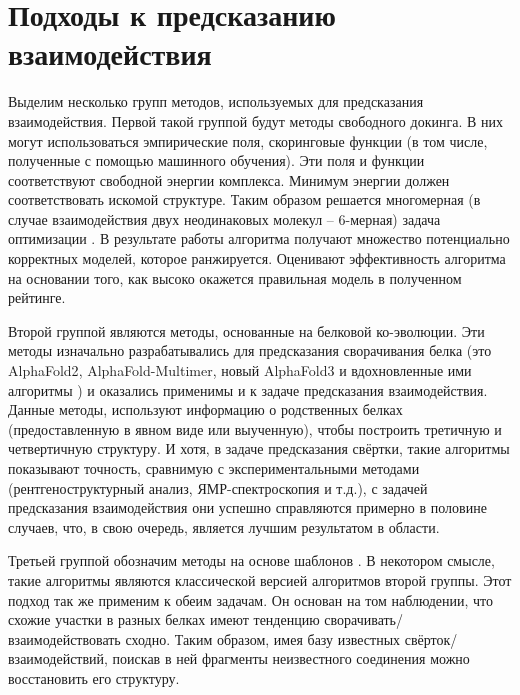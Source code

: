 \section{Подходы к предсказанию взаимодействия}
Выделим несколько групп методов, используемых для предсказания взаимодействия. Первой такой группой будут методы свободного докинга. В них могут использоваться эмпирические поля, скоринговые функции (в том числе, полученные с помощью машинного обучения). Эти поля и функции соответствуют свободной энергии комплекса. Минимум энергии должен соответствовать искомой структуре. Таким образом решается многомерная (в случае взаимодействия двух неодинаковых молекул – 6-мерная) задача оптимизации \cite{vreven}. В результате работы алгоритма получают множество потенциально корректных моделей, которое ранжируется. Оценивают эффективность алгоритма на основании того, как высоко окажется правильная модель в полученном рейтинге.

Второй группой являются методы, основанные на белковой ко-эволюции. Эти методы изначально разрабатывались для предсказания сворачивания белка (это AlphaFold2\cite{AF2}, AlphaFold-Multimer\cite{AFM}, новый AlphaFold3\cite{AF3} и вдохновленные ими алгоритмы \cite{AF_followers}) и оказались применимы и к задаче предсказания взаимодействия. Данные методы, используют информацию о родственных белках (предоставленную в явном виде или выученную), чтобы построить третичную и четвертичную структуру. И хотя, в задаче предсказания свёртки, такие алгоритмы показывают точность, сравнимую с экспериментальными методами (рентгеноструктурный анализ, ЯМР-спектроскопия и т.д.), с задачей предсказания взаимодействия они успешно справляются примерно в половине случаев, что, в свою очередь, является лучшим результатом в области.

Третьей группой обозначим методы на основе шаблонов \cite{andras}. В некотором смысле, такие алгоритмы являются классической версией алгоритмов второй группы. Этот подход так же применим к обеим задачам. Он основан на том наблюдении, что схожие участки в разных белках имеют тенденцию сворачивать/взаимодействовать сходно. Таким образом, имея базу известных свёрток/взаимодействий, поискав в ней фрагменты неизвестного соединения можно восстановить его структуру.

